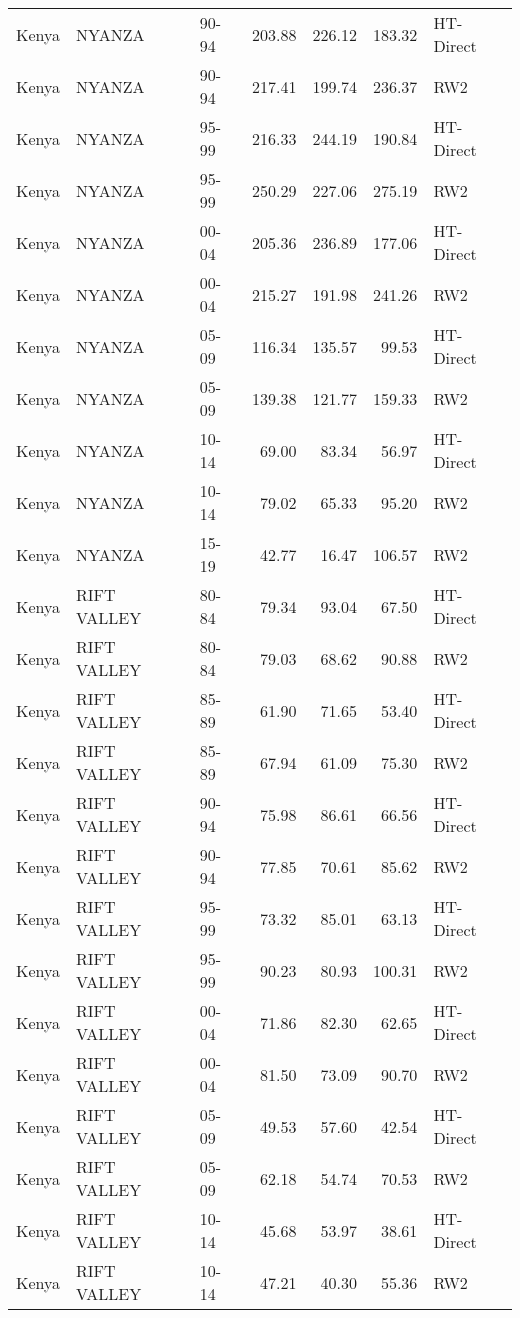 \begin{longtable}{lllrrrl}
  Kenya & NYANZA & 90-94 & 203.88 & 226.12 & 183.32 & HT-Direct \\ 
  Kenya & NYANZA & 90-94 & 217.41 & 199.74 & 236.37 & RW2 \\ 
  Kenya & NYANZA & 95-99 & 216.33 & 244.19 & 190.84 & HT-Direct \\ 
  Kenya & NYANZA & 95-99 & 250.29 & 227.06 & 275.19 & RW2 \\ 
  Kenya & NYANZA & 00-04 & 205.36 & 236.89 & 177.06 & HT-Direct \\ 
  Kenya & NYANZA & 00-04 & 215.27 & 191.98 & 241.26 & RW2 \\ 
  Kenya & NYANZA & 05-09 & 116.34 & 135.57 & 99.53 & HT-Direct \\ 
  Kenya & NYANZA & 05-09 & 139.38 & 121.77 & 159.33 & RW2 \\ 
  Kenya & NYANZA & 10-14 & 69.00 & 83.34 & 56.97 & HT-Direct \\ 
  Kenya & NYANZA & 10-14 & 79.02 & 65.33 & 95.20 & RW2 \\ 
  Kenya & NYANZA & 15-19 & 42.77 & 16.47 & 106.57 & RW2 \\ 
  Kenya & RIFT VALLEY & 80-84 & 79.34 & 93.04 & 67.50 & HT-Direct \\ 
  Kenya & RIFT VALLEY & 80-84 & 79.03 & 68.62 & 90.88 & RW2 \\ 
  Kenya & RIFT VALLEY & 85-89 & 61.90 & 71.65 & 53.40 & HT-Direct \\ 
  Kenya & RIFT VALLEY & 85-89 & 67.94 & 61.09 & 75.30 & RW2 \\ 
  Kenya & RIFT VALLEY & 90-94 & 75.98 & 86.61 & 66.56 & HT-Direct \\ 
  Kenya & RIFT VALLEY & 90-94 & 77.85 & 70.61 & 85.62 & RW2 \\ 
  Kenya & RIFT VALLEY & 95-99 & 73.32 & 85.01 & 63.13 & HT-Direct \\ 
  Kenya & RIFT VALLEY & 95-99 & 90.23 & 80.93 & 100.31 & RW2 \\ 
  Kenya & RIFT VALLEY & 00-04 & 71.86 & 82.30 & 62.65 & HT-Direct \\ 
  Kenya & RIFT VALLEY & 00-04 & 81.50 & 73.09 & 90.70 & RW2 \\ 
  Kenya & RIFT VALLEY & 05-09 & 49.53 & 57.60 & 42.54 & HT-Direct \\ 
  Kenya & RIFT VALLEY & 05-09 & 62.18 & 54.74 & 70.53 & RW2 \\ 
  Kenya & RIFT VALLEY & 10-14 & 45.68 & 53.97 & 38.61 & HT-Direct \\ 
  Kenya & RIFT VALLEY & 10-14 & 47.21 & 40.30 & 55.36 & RW2 \\ 

\end{longtable}
